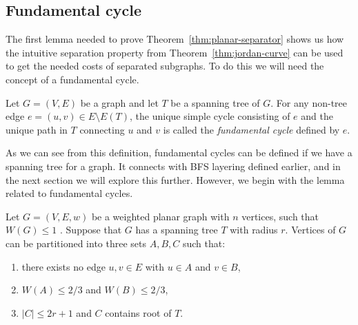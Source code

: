 \subsection{Fundamental cycle}
The first lemma needed to prove Theorem~\ref{thm:planar-separator} shows us how 
the intuitive separation property from Theorem~\ref{thm:jordan-curve} can be used
to get the needed costs of separated subgraphs. To do this we will need the concept 
of a fundamental cycle.
\begin{defn}\label{def:fundamental_cycle}
Let $G = (V, E)$ be a graph and let $T$ be a spanning tree of $G$.
For any non-tree edge $e = (u, v) \in E \setminus E(T)$, the unique simple cycle
consisting of $e$ and the unique path in $T$ connecting $u$ and $v$
is called the \emph{fundamental cycle} defined by $e$.
\end{defn}
As we can see from this definition, fundamental cycles can be defined if we have 
a spanning tree for a graph. It connects with BFS layering defined earlier, and in 
the next section we will explore this further. However, we begin with the lemma related
to fundamental cycles.
\begin{lemma} \cite{liptonSeparatorTheoremPlanar1979} \label{lem:fundamental_cycle}
    Let $G = (V, E, w)$ be a weighted planar graph with $n$ vertices, such that $W(G) \leq 1$
    . Suppose that $G$ has a spanning tree $T$ with
    radius $r$. Vertices of $G$ can be partitioned into three
    sets $A, B, C$ such that: 
    \begin{enumerate}
        \item[(a)] there exists no edge ${u, v} \in E$ with $u \in A$ and $v \in B$,
        \item[(b)] $W(A) \leq 2/3$ and $W(B) \leq 2/3$,
        \item[(c)] $|C| \leq 2r + 1$ and $C$ contains root of $T$. 
    \end{enumerate}
\end{lemma}
